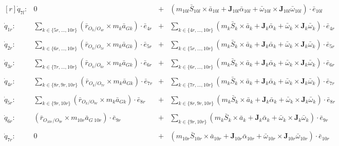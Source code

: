 \documentclass[a4paper,10pt]{article}
\begin{document}
\begin{align}
{\begin{matrix*}[r]
  \dot{q}_{7l}: & 0 & + & 
  \left( m_{10l} \bar{S}_{10l} \times \bar{a}_{10l} + \mathbf{J}_{10l} \bar{\alpha}_{10l} + \bar{\omega}_{10l} \times \mathbf{J}_{10l} \bar{\omega}_{10l}\right) \cdot  \bar{e}_{10l}\\ \\
  \dot{q}_{1r}: & \sum\limits_{k \in \{ 5r,...,10r \}} \left(\bar{r}_{O_k/O_{4r}} \times m_k \bar{a}_{Gk}\right) \cdot \bar{e}_{4r} & + & 
  \sum\limits_{k \in \{ 4r,...,10r \}} \left( m_k \bar{S}_k \times \bar{a}_k + \mathbf{J}_{k} \bar{\alpha}_k + \bar{\omega}_k \times \mathbf{J}_{k} \bar{\omega}_k\right) \cdot  \bar{e}_{4r}\\ \\
  \dot{q}_{2r}: & \sum\limits_{k \in \{ 6r,...,10r \}} \left(\bar{r}_{O_k/O_{5r}} \times m_k \bar{a}_{Gk}\right) \cdot \bar{e}_{5r} & + & 
  \sum\limits_{k \in \{ 5r,...,10r \}} \left( m_k \bar{S}_k \times \bar{a}_k + \mathbf{J}_{k} \bar{\alpha}_k + \bar{\omega}_k \times \mathbf{J}_{k} \bar{\omega}_k\right) \cdot  \bar{e}_{5r}\\ \\
  \dot{q}_{3r}: & \sum\limits_{k \in \{ 7r,...,10r \}} \left(\bar{r}_{O_k/O_{6r}} \times m_k \bar{a}_{Gk}\right) \cdot \bar{e}_{6r} & + & 
  \sum\limits_{k \in \{ 6r,...,10r \}} \left( m_k \bar{S}_k \times \bar{a}_k + \mathbf{J}_{k} \bar{\alpha}_k + \bar{\omega}_k \times \mathbf{J}_{k} \bar{\omega}_k\right) \cdot  \bar{e}_{6r}\\ \\
  \dot{q}_{4r}: & \sum\limits_{k \in \{ 8r,9r,10r \}} \left(\bar{r}_{O_k/O_{7r}} \times m_k \bar{a}_{Gk}\right) \cdot \bar{e}_{7r} & + & 
  \sum\limits_{k \in \{ 7r,...,10r \}} \left( m_k \bar{S}_k \times \bar{a}_k + \mathbf{J}_{k} \bar{\alpha}_k + \bar{\omega}_k \times \mathbf{J}_{k} \bar{\omega}_k\right) \cdot  \bar{e}_{7r}\\ \\
  \dot{q}_{5r}: & \sum\limits_{k \in \{ 9r,10r \}} \left(\bar{r}_{O_k/O_{8r}} \times m_k \bar{a}_{Gk}\right) \cdot \bar{e}_{8r} & + & 
  \sum\limits_{k \in \{ 8r,9r,10r \}} \left( m_k \bar{S}_k \times \bar{a}_k + \mathbf{J}_{k} \bar{\alpha}_k + \bar{\omega}_k \times \mathbf{J}_{k} \bar{\omega}_k\right) \cdot  \bar{e}_{8r}\\ \\
  \dot{q}_{6r}: & \left(\bar{r}_{O_{10r}/O_{9r}} \times m_{10r} \bar{a}_{G\;{10r}}\right) \cdot \bar{e}_{9r} & + & 
  \sum\limits_{k \in \{ 9r,10r \}} \left( m_k \bar{S}_k \times \bar{a}_k + \mathbf{J}_{k} \bar{\alpha}_k + \bar{\omega}_k \times \mathbf{J}_{k} \bar{\omega}_k\right) \cdot  \bar{e}_{9r}\\ \\
  \dot{q}_{7r}: & 0 & + & 
  \left( m_{10r} \bar{S}_{10r} \times \bar{a}_{10r} + \mathbf{J}_{10r} \bar{\alpha}_{10r} + \bar{\omega}_{10r} \times \mathbf{J}_{10r} \bar{\omega}_{10r}\right) \cdot \bar{e}_{10r}\\ \\
 \end{matrix*}} \label{kanesTree2}
\end{align}
\end{document}

